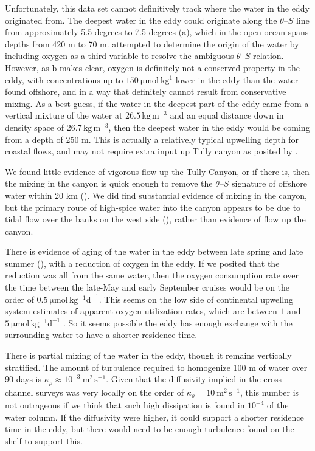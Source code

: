 \documentclass[draft]{agujournal2019}
\begin{document}
Unfortunately, this data set cannot definitively track where the water in the eddy originated from.  The deepest water in the eddy could originate along the $\theta$--$S$ line from approximately 5.5 degrees to 7.5 degrees (a), which in the open ocean spans depths from 420 m to 70 m.  \cite{mackasetal87} attempted to determine the origin of the water by including oxygen as a third variable to resolve the ambiguous $\theta$--$S$ relation.  However, as b makes clear, oxygen is definitely not a conserved property in the eddy, with concentrations up to $150 \ \mathrm{\mu mol\ kg^{1}}$ lower in the eddy than the water found offshore, and in a way that definitely cannot result from conservative mixing.  As a best guess, if the water in the deepest part of the eddy came from a vertical mixture of the water at $26.5\,\mathrm{kg\,m^{-3}}$ and an equal distance down in density space of $26.7\,\mathrm{kg\,m^{-3}}$, then the deepest water in the eddy would be coming from a depth of 250 m.  This is actually a relatively typical upwelling depth for coastal flows, and may not require extra input up Tully canyon as posited by \cite{freelanddenman82}.

We found little evidence of vigorous flow up the Tully Canyon, or if there is, then the mixing in the canyon is quick enough to remove the $\theta$--$S$ signature of offshore water within 20 km ().  We did find substantial evidence of mixing in the canyon, but the primary route of high-spice water into the canyon appears to be due to tidal flow over the banks on the west side (), rather than evidence of flow up the canyon.

There is evidence of aging of the water in the eddy between late spring and late summer (), with a reduction of oxygen in the eddy.  If we posited that the reduction was all from the same water, then the oxygen consumption rate over the time between the late-May and early September cruises would be on the order of $0.5\ \mathrm{\mu mol\, kg^{-1} d^{-1}}$.  This seems on the low side of continental upwellng system estimates of apparent oxygen utilization rates, which are between $1$ and $5\  \mathrm{\mu mol\, kg^{-1} d^{-1}}$ \cite{dortchetal94}.   So it seems possible the eddy has enough exchange with the surrounding water to have a shorter residence time.

There is partial mixing of the water in the eddy, though it remains vertically stratified.  The amount of turbulence required to homogenize 100 m of water over 90 days is $\kappa_{\rho} \approx 10^{-3}\ \mathrm{m^2\,s^{-1}}$.  Given that the diffusivity implied in the cross-channel surveys was very locally on the order of $\kappa_{\rho} = 10 \ \mathrm{m^2\,s^{-1}}$, this number is not outrageous if we think that such high dissipation is found in $10^{-4}$ of the water column.  If the diffusivity were higher, it could support a shorter residence time in the eddy, but there would need to be enough turbulence found on the shelf to support this.
\end{document}
